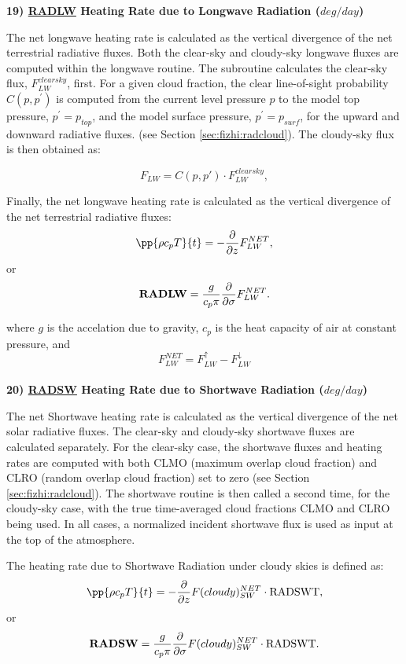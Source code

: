 \noindent
{\bf 19)  \underline {RADLW} Heating Rate due to Longwave Radiation ($deg/day$) }

\noindent
The net longwave heating rate is calculated as the vertical divergence of the
net terrestrial radiative fluxes.
Both the clear-sky and cloudy-sky longwave fluxes are computed within the
longwave routine.
The subroutine calculates the clear-sky flux, $F^{clearsky}_{LW}$, first.
For a given cloud fraction,
the clear line-of-sight probability $C(p,p^{\prime})$ is computed from the current level pressure $p$ 
to the model top pressure, $p^{\prime} = p_{top}$, and the model surface pressure, $p^{\prime} = p_{surf}$,
for the upward and downward radiative fluxes.
(see Section \ref{sec:fizhi:radcloud}).
The cloudy-sky flux is then obtained as:
   
\noindent
\[
F_{LW} = C(p,p') \cdot F^{clearsky}_{LW},
\]

\noindent
Finally, the net longwave heating rate is calculated as the vertical divergence of the
net terrestrial radiative fluxes:
\[
\pp{\rho c_p T}{t} = - {\partial \over \partial z} F_{LW}^{NET} ,
\]
or
\[
{\bf RADLW} = \frac{g}{c_p \pi} {\partial \over \partial \sigma} F_{LW}^{NET} .
\]

\noindent
where $g$ is the accelation due to gravity,
$c_p$ is the heat capacity of air at constant pressure,
and
\[
F_{LW}^{NET} = F_{LW}^\uparrow - F_{LW}^\downarrow
\]
\\


\noindent
{\bf 20)  \underline {RADSW} Heating Rate due to Shortwave Radiation ($deg/day$) }

\noindent
The net Shortwave heating rate is calculated as the vertical divergence of the
net solar radiative fluxes.
The clear-sky and cloudy-sky shortwave fluxes are calculated separately.
For the clear-sky case, the shortwave fluxes and heating rates are computed with
both CLMO (maximum overlap cloud fraction) and
CLRO (random overlap cloud fraction) set to zero (see Section \ref{sec:fizhi:radcloud}).
The shortwave routine is then called a second time, for the cloudy-sky case, with the
true time-averaged cloud fractions CLMO
and CLRO being used.  In all cases, a normalized incident shortwave flux is used as
input at the top of the atmosphere.

\noindent
The heating rate due to Shortwave Radiation under cloudy skies is defined as:
\[
\pp{\rho c_p T}{t} = - {\partial \over \partial z} F(cloudy)_{SW}^{NET} \cdot {\rm RADSWT},
\]
or
\[
{\bf RADSW} = \frac{g}{c_p \pi} {\partial \over \partial \sigma} F(cloudy)_{SW}^{NET}\cdot {\rm RADSWT} .
\]

